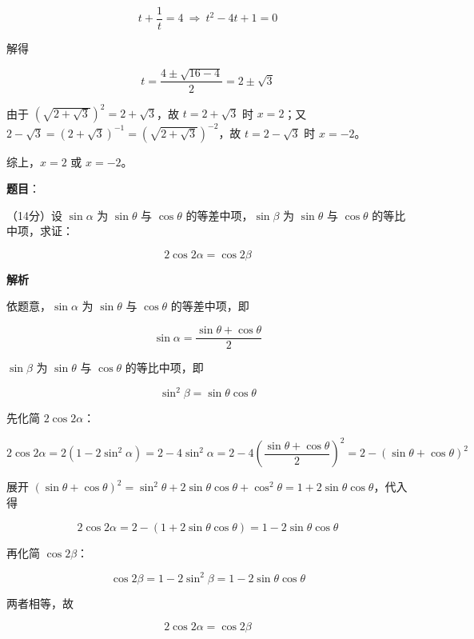 \begin{answer}
\nopagebreak[4]
\[
t+\frac1t=4\ \Longrightarrow\ t^2-4t+1=0
\]

解得

\nopagebreak[4]
\[
t=\frac{4\pm\sqrt{16-4}}2=2\pm\sqrt3
\]

由于 $\left(\sqrt{2+\sqrt3}\right)^2=2+\sqrt3$，故 $t=2+\sqrt3$ 时 $x=2$；又 $2-\sqrt3=(2+\sqrt3)^{-1}=\left(\sqrt{2+\sqrt3}\right)^{-2}$，故 $t=2-\sqrt3$ 时 $x=-2$。

综上，$x=2$ 或 $x=-2$。



\end{answer}
\begin{answer}

\textbf{题目}：

（14分）设 $\sin\alpha$ 为 $\sin\theta$ 与 $\cos\theta$ 的等差中项，$\sin\beta$ 为 $\sin\theta$ 与 $\cos\theta$ 的等比中项，求证：

\nopagebreak[4]
\[
2\cos2\alpha=\cos2\beta
\]

\textbf{解析}

依题意，$\sin\alpha$ 为 $\sin\theta$ 与 $\cos\theta$ 的等差中项，即

\nopagebreak[4]
\[
\sin\alpha=\frac{\sin\theta+\cos\theta}2
\]

$\sin\beta$ 为 $\sin\theta$ 与 $\cos\theta$ 的等比中项，即

\nopagebreak[4]
\[
\sin^2\beta=\sin\theta\cos\theta
\]

先化简 $2\cos2\alpha$：

\nopagebreak[4]
\[
2\cos2\alpha=2(1-2\sin^2\alpha)=2-4\sin^2\alpha=2-4\left(\frac{\sin\theta+\cos\theta}2\right)^2=2-(\sin\theta+\cos\theta)^2
\]

展开 $(\sin\theta+\cos\theta)^2=\sin^2\theta+2\sin\theta\cos\theta+\cos^2\theta=1+2\sin\theta\cos\theta$，代入得

\nopagebreak[4]
\[
2\cos2\alpha=2-(1+2\sin\theta\cos\theta)=1-2\sin\theta\cos\theta
\]

再化简 $\cos2\beta$：

\nopagebreak[4]
\[
\cos2\beta=1-2\sin^2\beta=1-2\sin\theta\cos\theta
\]

两者相等，故

\nopagebreak[4]
\[
2\cos2\alpha=\cos2\beta
\]


\end{answer}
